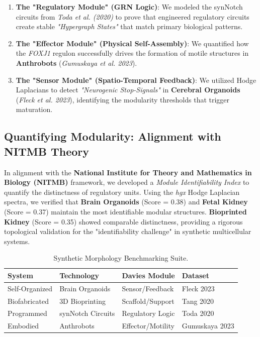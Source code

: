 \documentclass[11pt,twocolumn]{article}
\begin{document}
\begin{enumerate}
    \item \textbf{The "Regulatory Module" (GRN Logic)}: We modeled the synNotch circuits from \textit{Toda et al. (2020)} to prove that engineered regulatory circuits create stable \textit{"Hypergraph States"} that match primary biological patterns.
    \item \textbf{The "Effector Module" (Physical Self-Assembly)}: We quantified how the \textit{FOXJ1} regulon successfully drives the formation of motile structures in \textbf{Anthrobots} (\textit{Gumuskaya et al. 2023}).
    \item \textbf{The "Sensor Module" (Spatio-Temporal Feedback)}: We utilized Hodge Laplacians to detect \textit{"Neurogenic Stop-Signals"} in \textbf{Cerebral Organoids} (\textit{Fleck et al. 2023}), identifying the modularity thresholds that trigger maturation.
\end{enumerate}

\subsection{Quantifying Modularity: Alignment with NITMB Theory}

In alignment with the \textbf{National Institute for Theory and Mathematics in Biology (NITMB)} framework, we developed a \textit{Module Identifiability Index} to quantify the distinctness of regulatory units. Using the \textit{hgx} Hodge Laplacian spectra, we verified that \textbf{Brain Organoids} (Score = 0.38) and \textbf{Fetal Kidney} (Score = 0.37) maintain the most identifiable modular structures. \textbf{Bioprinted Kidney} (Score = 0.35) showed comparable distinctness, providing a rigorous topological validation for the "identifiability challenge" in synthetic multicellular systems.

\begin{table}[h]
\centering
\small
\begin{tabular}{@{}llll@{}}
\toprule
\textbf{System} & \textbf{Technology} & \textbf{Davies Module} & \textbf{Dataset} \\ \midrule
Self-Organized & Brain Organoids & Sensor/Feedback & Fleck 2023 \\
Biofabricated & 3D Bioprinting & Scaffold/Support & Tang 2020 \\
Programmed & synNotch Circuits & Regulatory Logic & Toda 2020 \\
Embodied & Anthrobots & Effector/Motility & Gumuskaya 2023 \\ \bottomrule
\end{tabular}
\caption{Synthetic Morphology Benchmarking Suite.}
\label{tab:suite}
\end{table}
\end{document}
